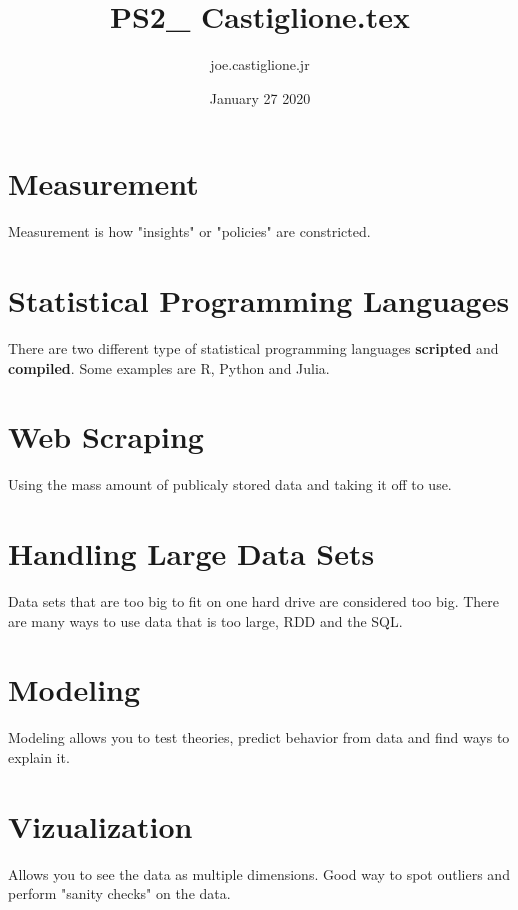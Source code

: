 \documentclass{article}
\title{PS2_ Castiglione.tex}
\author{joe.castiglione.jr }
\date{January 27 2020}
\begin{document}


\section{Measurement}
Measurement is how "insights" or "policies" are constricted. 
\section{Statistical Programming Languages}
There are two different type of statistical programming languages \textbf{scripted} and \textbf{compiled}. Some examples are R, Python and Julia. 
\section{Web Scraping}
Using the mass amount of publicaly stored data and taking it off to use. 
\section{Handling Large Data Sets}
Data sets that are too big to fit on one hard drive are considered too big. There are many ways to use data that is too large, RDD and the SQL.
\section{Modeling}
Modeling allows you to test theories, predict behavior from data and find ways to explain it. 
\section{Vizualization}
Allows you to see the data as multiple dimensions. Good way to spot outliers and perform "sanity checks" on the data. 
\end{document}
